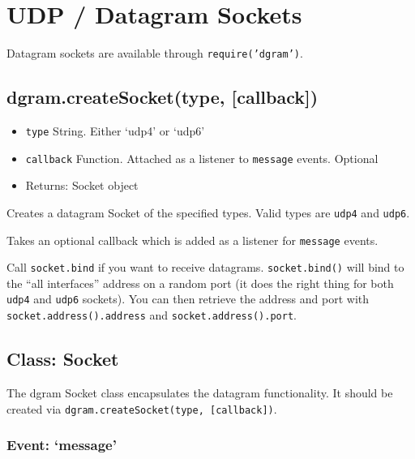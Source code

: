 \section{UDP / Datagram Sockets}

\begin{Shaded}
\begin{Highlighting}[]
\NormalTok{: } 
\end{Highlighting}
\end{Shaded}

Datagram sockets are available through \texttt{require('dgram')}.

\subsection{dgram.createSocket(type, {[}callback{]})}

\begin{itemize}
\item
  \texttt{type} String. Either `udp4' or `udp6'
\item
  \texttt{callback} Function. Attached as a listener to \texttt{message}
  events. Optional
\item
  Returns: Socket object
\end{itemize}

Creates a datagram Socket of the specified types. Valid types are
\texttt{udp4} and \texttt{udp6}.

Takes an optional callback which is added as a listener for
\texttt{message} events.

Call \texttt{socket.bind} if you want to receive datagrams.
\texttt{socket.bind()} will bind to the ``all interfaces'' address on a
random port (it does the right thing for both \texttt{udp4} and
\texttt{udp6} sockets). You can then retrieve the address and port with
\texttt{socket.address().address} and \texttt{socket.address().port}.

\subsection{Class: Socket}

The dgram Socket class encapsulates the datagram functionality. It
should be created via \texttt{dgram.createSocket(type, {[}callback{]})}.

\subsubsection{Event: `message'}


